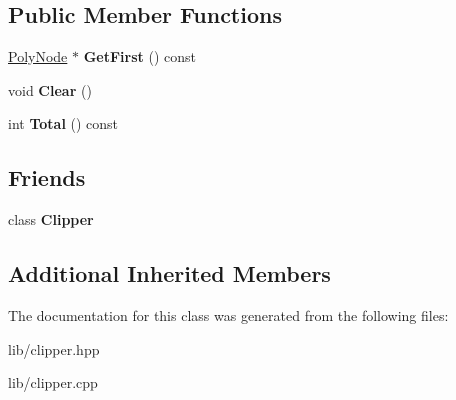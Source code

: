 \subsection*{Public Member Functions}
\begin{DoxyCompactItemize}
\item 
\mbox{\label{class_clipper_lib_1_1_poly_tree_a8b88b8d6225281ee7d536902b0d04e9e}} 
\hyperlink{class_clipper_lib_1_1_poly_node}{Poly\+Node} $\ast$ {\bfseries Get\+First} () const
\item 
\mbox{\label{class_clipper_lib_1_1_poly_tree_a8620ea631d478b3c43274ac084902ec4}} 
void {\bfseries Clear} ()
\item 
\mbox{\label{class_clipper_lib_1_1_poly_tree_ad0d3c974bab5a30cc8c916da9fe14388}} 
int {\bfseries Total} () const
\end{DoxyCompactItemize}
\subsection*{Friends}
\begin{DoxyCompactItemize}
\item 
\mbox{\label{class_clipper_lib_1_1_poly_tree_a4d39a09ecdddeeb85930dd4554a54b3c}} 
class {\bfseries Clipper}
\end{DoxyCompactItemize}
\subsection*{Additional Inherited Members}


The documentation for this class was generated from the following files\+:\begin{DoxyCompactItemize}
\item 
lib/clipper.\+hpp\item 
lib/clipper.\+cpp\end{DoxyCompactItemize}
